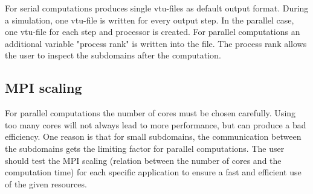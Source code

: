 For serial computations \Dumux produces single vtu-files as default output format. 
During a simulation, one vtu-file is written for every output step. 
In the parallel case, one vtu-file for each step and processor is created. 
For parallel computations an additional variable "process rank" is written 
into the file. The process rank allows the user to inspect the subdomains 
after the computation.

\subsection{MPI scaling}
For parallel computations the number of cores must be chosen 
carefully. Using too many cores will not always lead to more performance, but 
can produce a bad efficiency. One reason is that for small subdomains, the 
communication between the subdomains gets the limiting factor for parallel computations. 
The user should test the MPI scaling (relation between the number of cores and the computation time) 
for each specific application to ensure a fast and efficient use of the given resources.   
